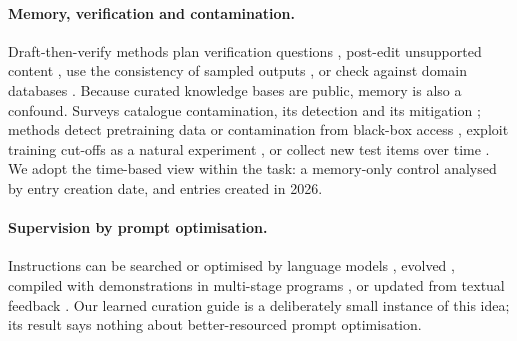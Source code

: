 \documentclass{article} %
\begin{document}
\paragraph{Memory, verification and contamination.}
Draft-then-verify methods plan verification questions \citep{dhuliawala2024chainofverification}, post-edit unsupported content \citep{Gao2022RarrResearching}, use the consistency of sampled outputs \citep{Manakul2023SelfcheckgptZeroresource}, or check against domain databases \citep{wang2025geneagent}. Because curated knowledge bases are public, memory is also a confound. Surveys catalogue contamination, its detection and its mitigation \citep{Xu2024BenchmarkData,Deng2024UnveilingSpectrum,Ravaut2024ComprehensiveSurvey,Cheng2025SurveyData,Chen2025RecentAdvances}; methods detect pretraining data or contamination from black-box access \citep{Shi2023DetectingPretraining,oren2024proving,golchin2024time,Golchin2025DataContamination}, exploit training cut-offs as a natural experiment \citep{Roberts2023DataContamination}, or collect new test items over time \citep{Jain2024LivecodebenchHolistic,White2024LivebenchChallenging}. We adopt the time-based view within the task: a memory-only control analysed by entry creation date, and entries created in 2026.

\paragraph{Supervision by prompt optimisation.}
Instructions can be searched or optimised by language models \citep{Zhou2022LargeLanguage,Pryzant2023AutomaticPrompt,Yang2023LargeLanguage}, evolved \citep{Guo2023EvopromptConnecting,Fernando2023PromptbreederSelfreferential,agrawal2026gepa}, compiled with demonstrations in multi-stage programs \citep{Khattab2023DspyCompiling,Opsahlong2024OptimizingInstructions}, or updated from textual feedback \citep{Yuksekgonul2024TextgradAutomatic}. Our learned curation guide is a deliberately small instance of this idea; its result says nothing about better-resourced prompt optimisation.
\end{document}

